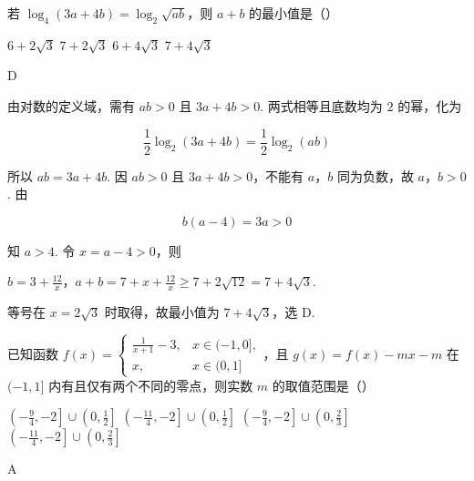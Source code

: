 \begin{problem}
若 \(\log_4(3a + 4b) = \log_2\sqrt{ab}\)，则 \(a + b\) 的最小值是（\quad）

\choices
    {\(6 + 2\sqrt{3}\)}
    {\(7 + 2\sqrt{3}\)}
    {\(6 + 4\sqrt{3}\)}
    {\(7 + 4\sqrt{3}\)}
\end{problem}

\begin{answer}
D
\end{answer}

\begin{solution}
由对数的定义域，需有 \(ab>0\) 且 \(3a+4b>0\). 两式相等且底数均为 \(2\) 的幂，化为

\[
\frac12\log_2(3a+4b)=\frac12\log_2(ab)
\]

所以 \(ab=3a+4b\). 因 \(ab>0\) 且 \(3a+4b>0\)，不能有 \(a\)，\(b\) 同为负数，故 \(a\)，\(b>0\). 由

\[
b(a-4)=3a>0
\]

知 \(a>4\). 令 \(x=a-4>0\)，则

\(b=3+\frac{12}{x}\)，\(a+b=7+x+\frac{12}{x} \geqslant7+2\sqrt{12}=7+4\sqrt3\).

等号在 \(x=2\sqrt3\) 时取得，故最小值为 \(7+4\sqrt3\)，选 D.
\end{solution}

\begin{problem}
已知函数 \( f(x) = \begin{cases}
\frac{1}{x + 1} - 3, & x \in (-1,0],\\
x, & x \in (0,1]
\end{cases} \)，且 \( g(x) = f(x) - mx - m \) 在 \((-1,1]\) 内有且仅有两个不同的零点，则实数 \(m\) 的取值范围是（\quad）

\choices
    {\(\left(-\frac{9}{4}, -2\right] \cup \left(0, \frac{1}{2}\right]\)}
    {\(\left(-\frac{11}{4}, -2\right] \cup \left(0, \frac{1}{2}\right]\)}
    {\(\left(-\frac{9}{4}, -2\right] \cup \left(0, \frac{2}{3}\right]\)}
    {\(\left(-\frac{11}{4}, -2\right] \cup \left(0, \frac{2}{3}\right]\)}
\end{problem}

\begin{answer}
A
\end{answer}

